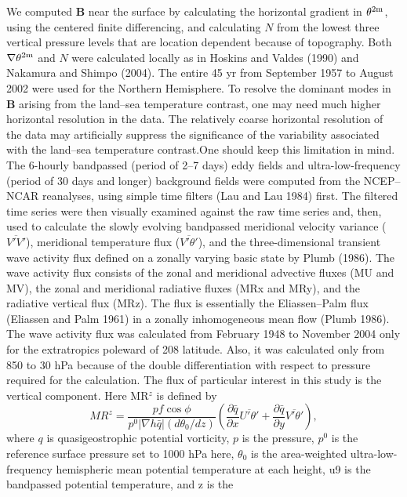 \documentclass{ametsocv6.2}
\begin{document}
We computed $\mathbf{B}$ near the surface by calculating the
horizontal gradient in $\theta^{2{\textrm m}}$, using the centered finite differencing,
and calculating $N$ from the lowest three vertical
pressure levels that are location dependent because of
topography. Both $\nabla\theta^{2{\textrm m}}$ and $N$ were calculated locally as in
Hoskins and Valdes (1990) and Nakamura and Shimpo
(2004). The entire 45 yr from September 1957 to August
2002 were used for the Northern Hemisphere. To resolve
the dominant modes in $\mathbf{B}$ arising from the land--sea temperature
contrast, one may need much higher horizontal
resolution in the data. The relatively coarse horizontal
resolution of the data may artificially suppress the significance
of the variability associated with the land--sea temperature
contrast.One should keep this limitation in mind.
The 6-hourly bandpassed (period of 2--7 days) eddy
fields and ultra-low-frequency (period of 30 days and longer)
background fields were computed from the NCEP--
NCAR reanalyses, using simple time filters (Lau and Lau
1984) first. The filtered time series were then visually examined
against the raw time series and, then, used to calculate
the slowly evolving bandpassed meridional velocity
variance ($\overline{V'V'}$), meridional temperature flux ($\overline{V'\theta'}$), and
the three-dimensional transient wave activity flux defined
on a zonally varying basic state by Plumb (1986). The wave
activity flux consists of the zonal and meridional advective
fluxes (MU and MV), the zonal and meridional
radiative fluxes (MRx and MRy), and the radiative vertical
flux (MRz). The flux is essentially the Eliassen--Palm
flux (Eliassen and Palm 1961) in a zonally inhomogeneous
mean flow (Plumb 1986). The wave activity flux was calculated
from February 1948 to November 2004 only for
the extratropics poleward of 208 latitude. Also, it was
calculated only from 850 to 30 hPa because of the double
differentiation with respect to pressure required for the
calculation. The flux of particular interest in this study is
the vertical component. Here MR$^z$ is defined by
\[
MR^z=
\frac{
pf \cos\phi}
{p^0|\nabla h\bar q|(d\theta_0/dz)}
\left(\frac{\partial\bar q}{\partial x}
\overline{U'\theta'} +
\frac{\partial\bar q}{\partial y}
\overline{V'\theta'}\right), 
\]
where $q$ is quasigeostrophic potential vorticity, $p$ is the
pressure, $p^0$ is the reference surface pressure set to
1000 hPa here, $\theta_0$ is the area-weighted ultra-low-frequency
hemispheric mean potential temperature at each height,
u9 is the bandpassed potential temperature, and z is the
\end{document}
